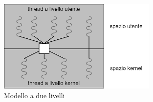             \newpage
            \begin{figure}
                \centering
                \includegraphics[width=0.7\textwidth]{img/thread5.png}
                \caption{Modello a due livelli}
                \label{fig:my_label}
                \vspace{5.6in}
            \end{figure}